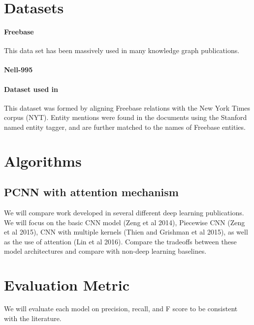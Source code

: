 \documentclass{article}
\begin{document}
\section{Datasets}
	
	\paragraph{Freebase} This data set has been massively used in many knowledge graph publications.
	
	\paragraph{Nell-995}
	
	\paragraph{Dataset used in \citet{Riedel2010}} This dataset was formed by aligning Freebase relations with the New York Times corpus (NYT). Entity mentions were found in the documents using the Stanford named entity tagger, and are further matched to the names of Freebase entities.

  
\section{Algorithms}

\subsection{}

\subsection{PCNN with attention mechanism}
	We will compare work developed in several different deep learning publications. We will focus on the basic CNN model (Zeng et al 2014), Piecewise CNN (Zeng et al 2015), CNN with multiple kernels (Thien and Grishman et al 2015), as well as the use of attention (Lin et al 2016). Compare the tradeoffs between these model architectures and compare with non-deep learning baselines. \citet{Mintz:2009:DSR:1690219.16}
  

\section{Evaluation Metric}
	We will evaluate each model on precision, recall, and F score to be consistent with the literature.
  
\end{document}
